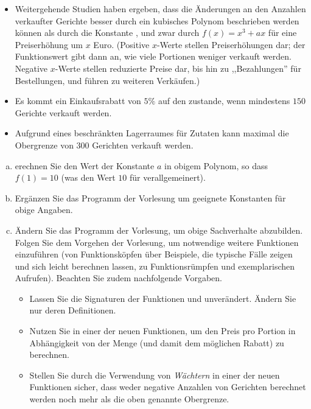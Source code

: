 \begin{frame}[fragile]
    \begin{exercise}
    \begin{itemize}
        \item Weitergehende Studien haben ergeben, dass die Änderungen an den Anzahlen verkaufter Gerichte besser durch ein kubisches Polynom beschrieben werden können als durch die Konstante , und zwar durch $f(x) = x^3 + ax$ für eine Preiserhöhung um $x$ Euro. (Positive $x$-Werte stellen Preiserhöhungen dar; der Funktionswert gibt dann an, wie viele Portionen weniger verkauft werden. Negative $x$-Werte stellen reduzierte Preise dar, bis hin zu ,,Bezahlungen'' für Bestellungen, und führen zu weiteren Verkäufen.)
        \item Es kommt ein Einkaufsrabatt von $5\%$ auf den  zustande, wenn mindestens $150$ Gerichte verkauft werden.
        \item Aufgrund eines beschränkten Lagerraumes für Zutaten kann maximal die Obergrenze von $300$ Gerichten verkauft werden.
    \end{itemize}
    \begin{enumerate}[a)]
        \item erechnen Sie den Wert der Konstante $a$ in obigem Polynom, so dass $f(1) = 10$ (was den Wert $10$ für  verallgemeinert).
        \item Ergänzen Sie das Programm der Vorlesung um geeignete Konstanten für obige Angaben.
        \item Ändern Sie das Programm der Vorlesung, um obige Sachverhalte abzubilden. Folgen Sie dem Vorgehen der Vorlesung, um notwendige weitere Funktionen einzuführen (von Funktionsköpfen über Beispiele, die typische Fälle zeigen und sich leicht berechnen lassen, zu Funktionsrümpfen und exemplarischen Aufrufen). Beachten Sie zudem nachfolgende Vorgaben.
        \begin{itemize}
            \item Lassen Sie die Signaturen der Funktionen  und  unverändert. Ändern Sie nur deren Definitionen.
            \item Nutzen Sie  in einer der neuen Funktionen, um den Preis pro Portion in Abhängigkeit von der Menge (und damit dem möglichen Rabatt) zu berechnen.
            \item Stellen Sie durch die Verwendung von \textit{Wächtern} in einer der neuen Funktionen sicher, dass weder negative Anzahlen von Gerichten berechnet werden noch mehr als die oben genannte Obergrenze.

\end{itemize}
\end{enumerate}
\end{exercise}
\end{frame}
